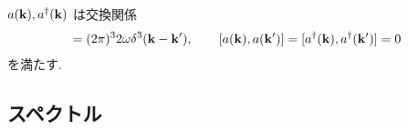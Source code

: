 \documentclass[../note01.tex]{subfiles}
\begin{document}
\begin{kekka}
    $ a(\vb{k}),a^\dagger(\vb{k}) $ は交換関係
    \begin{align}
        [a(\vb{k}),a^\dagger(\vb{k}')] = (2\pi)^3 2\omega\delta^3(\vb{k}-\vb{k}'),\qquad [a(\vb{k}),a(\vb{k}')]=[a^\dagger(\vb{k}),a^\dagger(\vb{k}')]=0
    \end{align}
    を満たす.
\end{kekka}

\subsection{スペクトル}
\end{document}
